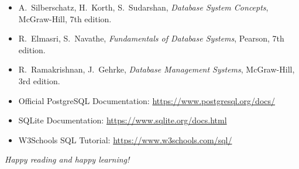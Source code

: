 \begin{itemize}
    \item A.~Silberschatz, H.~Korth, S.~Sudarshan, \emph{Database System Concepts},
          McGraw-Hill, 7th edition.
    \item R.~Elmasri, S.~Navathe, \emph{Fundamentals of Database Systems},
          Pearson, 7th edition.
    \item R.~Ramakrishnan, J.~Gehrke, \emph{Database Management Systems},
          McGraw-Hill, 3rd edition.
    \item Official PostgreSQL Documentation: \url{https://www.postgresql.org/docs/}
    \item SQLite Documentation: \url{https://www.sqlite.org/docs.html}
    \item W3Schools SQL Tutorial: \url{https://www.w3schools.com/sql/}
\end{itemize}

\vfill
\begin{flushright}
\textit{Happy reading and happy learning!}
\end{flushright}
